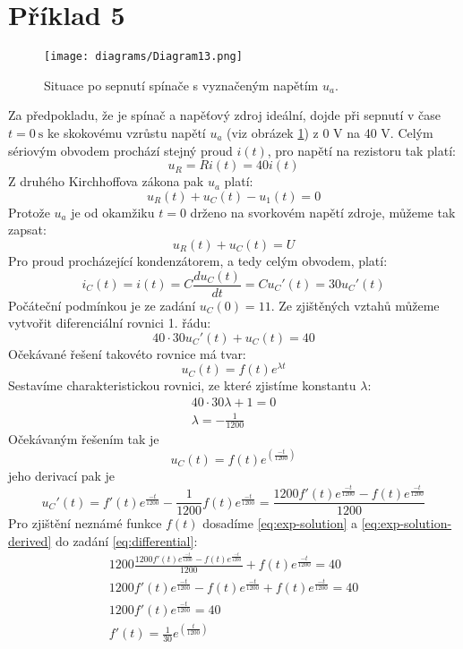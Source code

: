 \section{Příklad 5}

\begin{figure}[b]
    \centering
    \texttt{[image: diagrams/Diagram13.png]}
    \caption{Situace po sepnutí spínače s vyznačeným napětím $u_a$.}
    \label{fig:circ-5-1}
\end{figure}
Za předpokladu, že je spínač a napěťový zdroj ideální, dojde při sepnutí v čase $t = \SI{0}{\second}$ ke skokovému vzrůstu napětí $u_a$ (viz obrázek \ref{fig:circ-5-1}) z 0 V na 40 V. Celým sériovým obvodem prochází stejný proud $i(t)$, pro napětí na rezistoru tak platí:
\[ u_R = R i(t) = 40 i(t) \]
Z druhého Kirchhoffova zákona pak $u_a$ platí:
\[ u_R(t) + u_C(t) - u_1(t) = 0  \]
Protože $u_a$ je od okamžiku $t = 0$ drženo na svorkovém napětí zdroje, můžeme tak zapsat:
\[ u_R(t) + u_C(t) = U \]
Pro proud procházející kondenzátorem, a tedy celým obvodem, platí:
\[
    i_C(t) = i(t) = C\frac{du_C(t)}{dt} = C u_C'(t) = 30 u_C'(t)
\]
Počáteční podmínkou je ze zadání $u_C(0) = 11$. Ze zjištěných vztahů můžeme vytvořit diferenciální rovnici 1. řádu:
\begin{equation} \label{eq:differential}
    40\cdot 30 u_C'(t) + u_C(t) = 40
\end{equation}
Očekávané řešení takovéto rovnice má tvar:
\[
    u_C(t) = f(t) e^{\lambda t}
\]
Sestavíme charakteristickou rovnici, ze které zjistíme konstantu $\lambda$:
\begin{gather*}
    40\cdot 30\lambda + 1 = 0 \\
    \lambda = -\frac{1}{1200}
\end{gather*}
Očekávaným řešením tak je
\begin{equation} \label{eq:exp-solution}
    u_C(t) = f(t) e^{\displaystyle \left(\frac{-t}{1200}\right)}
\end{equation}
jeho derivací pak je
\begin{equation} \label{eq:exp-solution-derived}
    u_C'(t) = f'(t) e^{\frac{-t}{1200}} - \frac{1}{1200} f(t) e^{\frac{-t}{1200}} = \frac{1200 f'(t) e^{\frac{-t}{1200}} - f(t) e^{\frac{-t}{1200}}}{1200}
\end{equation}
Pro zjištění neznámé funkce $f(t)$ dosadíme \eqref{eq:exp-solution} a \eqref{eq:exp-solution-derived} do zadání \eqref{eq:differential}:
\begin{gather*}
    1200\frac{1200 f'(t) e^{\frac{-t}{1200}} - f(t) e^{\frac{-t}{1200}}}{1200} + f(t) e^{\frac{-t}{1200}} = 40 \\
    1200 f'(t) e^{\frac{-t}{1200}} - f(t) e^{\frac{-t}{1200}} + f(t) e^{\frac{-t}{1200}} = 40 \\
    1200 f'(t) e^{\frac{-t}{1200}} = 40 \\
    f'(t) = \frac{1}{30} e^{\displaystyle \left(\frac{t}{1200}\right)}
\end{gather*}
